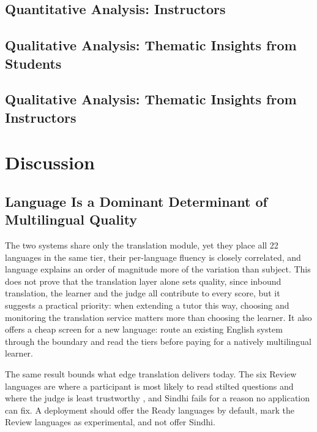 \documentclass[pdflatex,sn-mathphys-num]{sn-jnl}%
\theoremstyle{thmstyleone}%
\theoremstyle{thmstyletwo}%
\theoremstyle{thmstylethree}%
\begin{document}
\subsection{Quantitative Analysis: Instructors}

\subsection{Qualitative Analysis: Thematic Insights from Students}

\subsection{Qualitative Analysis: Thematic Insights from Instructors}

\section{Discussion}\label{sec:discussion}

\subsection{Language Is a Dominant Determinant of Multilingual Quality}

The two systems share only the translation module, yet they place all 22 languages in the same tier,
their per-language fluency is closely correlated, and language explains an order of magnitude more of
the variation than subject. This does not prove that the translation layer alone sets quality, since
inbound translation, the learner and the judge all contribute to every score, but it suggests a
practical priority: when extending a tutor this way, choosing and monitoring the translation service
matters more than choosing the learner. It also offers a cheap screen for a new language: route an
existing English system through the boundary and read the tiers before paying for a natively
multilingual learner.

The same result bounds what edge translation delivers today. The six Review languages are where a
participant is most likely to read stilted questions and where the judge is least trustworthy
\cite{hada2024multilingual}, and Sindhi fails for a reason no application can fix. A deployment should
offer the Ready languages by default, mark the Review languages as experimental, and not offer
Sindhi.
\end{document}
